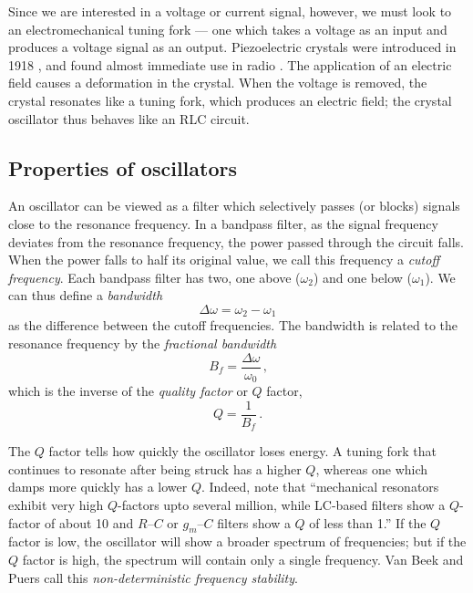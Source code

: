 \documentclass[12pt]{article}
\begin{document}
Since we are interested in a voltage or current signal, however, we must look to an electromechanical tuning fork --- one which takes a voltage as an input and produces a voltage signal as an output. Piezoelectric crystals were introduced in 1918 \citep{Nicolson1918}, and found almost immediate use in radio \citep{Bayard1926}. The application of an electric field causes a deformation in the crystal. When the voltage is removed, the crystal resonates like a tuning fork, which produces an electric field; the crystal oscillator thus behaves like an RLC circuit.

\subsection{Properties of oscillators}
An oscillator can be viewed as a filter which selectively passes (or blocks) signals close to the resonance frequency. In a bandpass filter, as the signal frequency deviates from the resonance frequency, the power passed through the circuit falls. When the power falls to half its original value, we call this frequency a \textit{cutoff frequency}. Each bandpass filter has two, one above ($\omega_2$) and one below ($\omega_1$). We can thus define a \textit{bandwidth}
\begin{equation}
\Delta\omega = \omega_2 - \omega_1
\end{equation} as the difference between the cutoff frequencies. The bandwidth is related to the resonance frequency by the \textit{fractional bandwidth}
\begin{equation}
B_f = \frac{\Delta\omega}{\omega_0}\,\text{,}
\end{equation}
which is the inverse of the \textit{quality factor} or $Q$ factor,
\begin{equation}
Q = \frac{1}{B_f}\,\text{.}
\end{equation}

The $Q$ factor tells how quickly the oscillator loses energy. A tuning fork that continues to resonate after being struck has a higher $Q$, whereas one which damps more quickly has a lower $Q$. Indeed, \citet{VanBeek2012} note that ``mechanical resonators exhibit very high $Q$-factors upto several million, while LC-based filters show a $Q$-factor of about 10 and $R$--$C$ or $g_m$--$C$ filters show a $Q$ of less than 1.'' If the $Q$ factor is low, the oscillator will show a broader spectrum of frequencies; but if the $Q$ factor is high, the spectrum will contain only a single frequency. Van Beek and Puers call this \textit{non-deterministic frequency stability}. %
\end{document}
